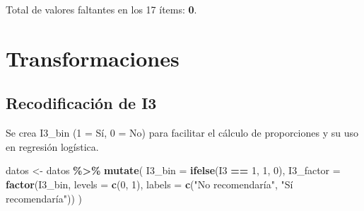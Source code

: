 \documentclass[
  spanish,
]{article}
\newenvironment{Shaded}{\begin{snugshade}}{\end{snugshade}}
\newcommand{\AttributeTok}[1]{\textcolor[rgb]{0.13,0.29,0.53}{#1}}
\newcommand{\ConstantTok}[1]{\textcolor[rgb]{0.56,0.35,0.01}{#1}}
\newcommand{\DecValTok}[1]{\textcolor[rgb]{0.00,0.00,0.81}{#1}}
\newcommand{\FunctionTok}[1]{\textcolor[rgb]{0.13,0.29,0.53}{\textbf{#1}}}
\newcommand{\NormalTok}[1]{#1}
\newcommand{\OtherTok}[1]{\textcolor[rgb]{0.56,0.35,0.01}{#1}}
\newcommand{\SpecialCharTok}[1]{\textcolor[rgb]{0.81,0.36,0.00}{\textbf{#1}}}
\newcommand{\StringTok}[1]{\textcolor[rgb]{0.31,0.60,0.02}{#1}}
\begin{document}
Total de valores faltantes en los 17 ítems: \textbf{0}.

\section{Transformaciones}\label{transformaciones}

\subsection{Recodificación de I3}\label{recodificaciuxf3n-de-i3}

Se crea I3\_bin (1 = Sí, 0 = No) para facilitar el cálculo de
proporciones y su uso en regresión logística.

\begin{Shaded}
\begin{Highlighting}[]
\NormalTok{datos }\OtherTok{\textless{}{-}}\NormalTok{ datos }\SpecialCharTok{\%\textgreater{}\%}
  \FunctionTok{mutate}\NormalTok{(}
    \AttributeTok{I3\_bin    =} \FunctionTok{ifelse}\NormalTok{(I3 }\SpecialCharTok{==} \DecValTok{1}\NormalTok{, }\DecValTok{1}\NormalTok{, }\DecValTok{0}\NormalTok{),}
    \AttributeTok{I3\_factor =} \FunctionTok{factor}\NormalTok{(I3\_bin, }\AttributeTok{levels =} \FunctionTok{c}\NormalTok{(}\DecValTok{0}\NormalTok{, }\DecValTok{1}\NormalTok{),}
                       \AttributeTok{labels =} \FunctionTok{c}\NormalTok{(}\StringTok{"No recomendaría"}\NormalTok{, }\StringTok{"Sí recomendaría"}\NormalTok{))}
\NormalTok{  )}
\end{Highlighting}
\end{Shaded}

\begin{Shaded}
\end{Shaded}
\end{document}
